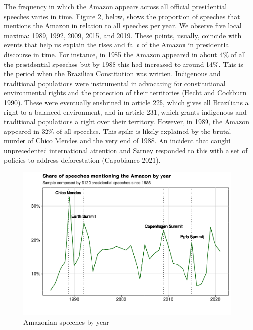 \documentclass[
]{article}
\begin{document}
The frequency in which the Amazon appears across all official
presidential speeches varies in time. Figure 2, below, shows the
proportion of speeches that mentions the Amazon in relation to all
speeches per year. We observe five local maxima: 1989, 1992, 2009, 2015,
and 2019. These points, usually, coincide with events that help us
explain the rises and falls of the Amazon in presidential discourse in
time. For instance, in 1985 the Amazon appeared in about 4\% of all the
presidential speeches but by 1988 this had increased to around 14\%.
This is the period when the Brazilian Constitution was written.
Indigenous and traditional populations were instrumental in advocating
for constitutional environmental rights and the protection of their
territories (Hecht and Cockburn 1990). These were eventually enshrined
in article 225, which gives all Brazilians a right to a balanced
environment, and in article 231, which grants indigenous and traditional
populations a right over their territory. However, in 1989, the Amazon
appeared in 32\% of all speeches. This spike is likely explained by the
brutal murder of Chico Mendes and the very end of 1988. An incident that
caught unprecedented international attention and Sarney responded to
this with a set of policies to address deforestation (Capobianco 2021).

\begin{figure}
\centering
\includegraphics{Full_draft_20220608_files/figure-latex/Figure 2-1.pdf}
\caption{Amazonian speeches by year}
\end{figure}
\end{document}

